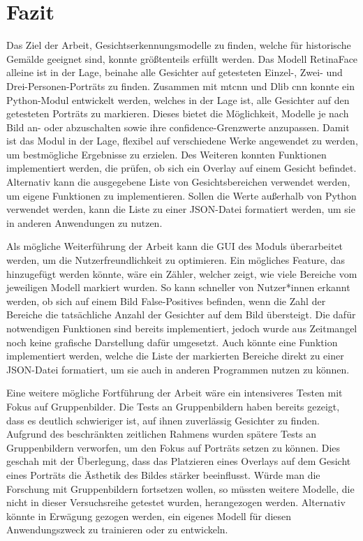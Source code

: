 \chapter{Fazit}
%
Das Ziel der Arbeit, Gesichtserkennungsmodelle zu finden, welche für historische Gemälde geeignet sind, konnte größtenteils erfüllt werden. Das Modell RetinaFace alleine ist in der Lage, beinahe alle Gesichter auf getesteten Einzel-, Zwei- und Drei-Personen-Porträts zu finden. Zusammen mit \gls{mtcnn} und Dlib \gls{cnn} konnte ein Python-Modul entwickelt werden, welches in der Lage ist, alle Gesichter auf den getesteten Porträts zu markieren. Dieses bietet die Möglichkeit, Modelle je nach Bild an- oder abzuschalten sowie ihre \gls{confidence}-Grenzwerte anzupassen. Damit ist das Modul in der Lage, flexibel auf verschiedene Werke angewendet zu werden, um bestmögliche Ergebnisse zu erzielen. Des Weiteren konnten Funktionen implementiert werden, die prüfen, ob sich ein Overlay auf einem Gesicht befindet. Alternativ kann die ausgegebene Liste von Gesichtsbereichen verwendet werden, um eigene Funktionen zu implementieren. Sollen die Werte außerhalb von Python verwendet werden, kann die Liste zu einer JSON-Datei formatiert werden, um sie in anderen Anwendungen zu nutzen.

Als mögliche Weiterführung der Arbeit kann die GUI des Moduls überarbeitet werden, um die Nutzerfreundlichkeit zu optimieren. Ein mögliches Feature, das hinzugefügt werden könnte, wäre ein Zähler, welcher zeigt, wie viele Bereiche vom jeweiligen Modell markiert wurden. So kann schneller von Nutzer*innen erkannt werden, ob sich auf einem Bild False-Positives befinden, wenn die Zahl der Bereiche die tatsächliche Anzahl der Gesichter auf dem Bild übersteigt. Die dafür notwendigen Funktionen sind bereits implementiert, jedoch wurde aus Zeitmangel noch keine grafische Darstellung dafür umgesetzt. Auch könnte eine Funktion implementiert werden, welche die Liste der markierten Bereiche direkt zu einer JSON-Datei formatiert, um sie auch in anderen Programmen nutzen zu können.

Eine weitere mögliche Fortführung der Arbeit wäre ein intensiveres Testen mit Fokus auf Gruppenbilder. Die Tests an Gruppenbildern haben bereits gezeigt, dass es deutlich schwieriger ist, auf ihnen zuverlässig Gesichter zu finden. Aufgrund des beschränkten zeitlichen Rahmens wurden spätere Tests an Gruppenbildern verworfen, um den Fokus auf Porträts setzen zu können. Dies geschah mit der Überlegung, dass das Platzieren eines Overlays auf dem Gesicht eines Porträts die Ästhetik des Bildes stärker beeinflusst. Würde man die Forschung mit Gruppenbildern fortsetzen wollen, so müssten weitere Modelle, die nicht in dieser Versuchsreihe getestet wurden, herangezogen werden. Alternativ könnte in Erwägung gezogen werden, ein eigenes Modell für diesen Anwendungszweck zu trainieren oder zu entwickeln.